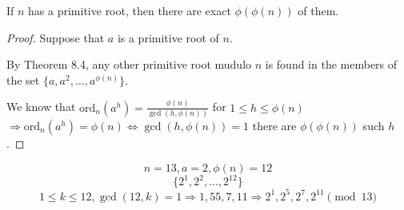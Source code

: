 \begin{corollary}
    If $n$ has a primitive root, then there are exact $\phi(\phi(n))$ of them.
\end{corollary}
\begin{proof}
    Suppose that $a$ is a primitive root of $n$.

    By Theorem 8.4, any other primitive root mudulo $n$ is found in the members of the set 
    $\{a, a^2, \dots, a^{\phi(n)}\}$.

     We know that $\text{ord}_n(a^h) = \frac{\phi(n)}{\gcd(h, \phi(n))}$ for $1 \leq h \leq \phi(n)$
     $\Rightarrow \text{ord}_n(a^h) = \phi(n) \iff \gcd(h, \phi(n)) = 1$
    there are $\phi(\phi(n))$ such $h$.
\end{proof}
\begin{eg}
    \[
        n=13, a=2, \phi(n) = 12
    \]
    \[
        \{2^1, 2^2, \dots, 2^{12}\}
    \]
    \[
        1 \leq k \leq 12, \gcd(12, k) = 1 \Rightarrow 1, 55, 7, 11 \Rightarrow 2^1, 2^5, 2^7, 2^{11} \pmod {13}
    \]
\end{eg}